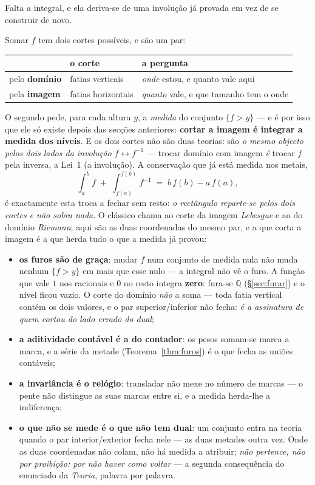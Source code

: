\documentclass[11pt,a4paper]{article}
\begin{document}
Falta a integral, e ela deriva-se de uma involução já provada em vez de se construir de novo.

\smallskip
\noindent Somar $f$ tem dois cortes possíveis, e são um par:

\begin{center}\small
\begin{tabular}{@{}lll@{}}
\toprule
 & o corte & a pergunta \\
\midrule
pelo \textbf{domínio} & fatias verticais & \emph{onde} estou, e quanto vale aqui \\
pela \textbf{imagem} & fatias horizontais & \emph{quanto} vale, e que tamanho tem o onde \\
\bottomrule
\end{tabular}
\end{center}

\noindent O segundo pede, para cada altura $y$, a \emph{medida} do conjunto $\{f>y\}$ --- e é por
isso que ele só existe depois das secções anteriores: \textbf{cortar a imagem é integrar a medida
dos níveis}. E os dois cortes não são duas teorias: são \emph{o mesmo objecto pelos dois lados da
involução} $f\leftrightarrow f^{-1}$ --- trocar domínio com imagem \emph{é} trocar $f$ pela
inversa, a Lei~1 (a involução). A conservação que já está medida nos metais,
\[
  \int_a^{b} f \;+\; \int_{f(a)}^{f(b)} f^{-1} \;=\; b\,f(b)-a\,f(a),
\]
é exactamente esta troca a fechar sem resto: \emph{o rectângulo reparte-se pelos dois cortes e não
sobra nada}. O clássico chama ao corte da imagem \emph{Lebesgue} e ao do domínio \emph{Riemann};
aqui são as duas coordenadas do mesmo par, e a que corta a imagem é a que herda tudo o que a
medida já provou:

\begin{itemize}
\item \textbf{os furos são de graça}: mudar $f$ num conjunto de medida nula não muda nenhum
$\{f>y\}$ em mais que esse nulo --- a integral não vê o furo. A função que vale $1$ nos racionais
e $0$ no resto integra \textbf{zero}: fura-se $\mathbb{Q}$ (\S\ref{sec:furar}) e o nível ficou
vazio. O corte do domínio \emph{não} a soma --- toda fatia vertical contém os dois valores, e o
par superior/inferior não fecha: \emph{é a assinatura de quem cortou do lado errado do dual};
\item \textbf{a aditividade contável é a do contador}: os pesos somam-se marca a marca, e a série
da metade (Teorema~\ref{thm:furos}) é o que fecha as uniões contáveis;
\item \textbf{a invariância é o relógio}: transladar não mexe no número de marcas --- o pente não
distingue as suas marcas entre si, e a medida herda-lhe a indiferença;
\item \textbf{o que não se mede é o que não tem dual}: um conjunto entra na teoria quando o par
interior/exterior fecha nele --- as duas metades outra vez. Onde as duas coordenadas não colam,
não há medida a atribuir; \emph{não pertence, não por proibição: por não haver como voltar} --- a
segunda consequência do enunciado da \emph{Teoria}, palavra por palavra.
\end{itemize}
\end{document}

